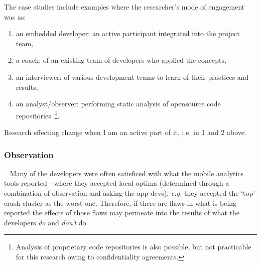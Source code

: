 The case studies include examples where the researcher's mode of engagement was as:
\begin{enumerate}
    \itemsep0em
    \item an embedded developer: an active participant integrated into the project team,
    \item a coach: of an existing team of developers who applied the concepts,
    \item an interviewer: of various development teams to learn of their practices and results,
    \item an analyst/observer: performing static analysis of opensource code repositories~\footnote{Analysis of proprietary code repositories is also possible, but not practicable for this research owing to confidentiality agreements.}.
\end{enumerate}

Research effecting change when I am an active part of it, i.e. in 1 and 2 above.

\subsubsection{Observation}~\label{section-observation-research-method}
Many of the developers were often satisficed with what the mobile analytics tools reported - where they accepted local optima (determined through a combination of observation and asking the app devs), \textit{e.g.} they accepted the `top' crash cluster as the worst one. Therefore, if there are flaws in what is being reported the effects of those flaws may permeate into the results of what the developers \textit{do} and \textit{don't} do. 

